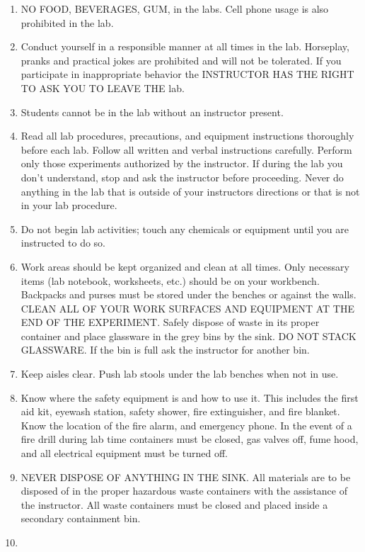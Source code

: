 \documentclass[]{book}
\providecommand{\tightlist}{%
  \setlength{\itemsep}{0pt}\setlength{\parskip}{0pt}}
\begin{document}
\begin{enumerate}
\def\labelenumi{\arabic{enumi}.}
\tightlist
\item
  NO FOOD, BEVERAGES, GUM, in the labs. Cell phone usage is also prohibited in the lab.
\item
  Conduct yourself in a responsible manner at all times in the lab. Horseplay, pranks and practical jokes are prohibited and will not be tolerated. If you participate in inappropriate behavior the INSTRUCTOR HAS THE RIGHT TO ASK YOU TO LEAVE THE lab.
\item
  Students cannot be in the lab without an instructor present.
\item
  Read all lab procedures, precautions, and equipment instructions thoroughly before each lab. Follow all written and verbal instructions carefully. Perform only those experiments authorized by the instructor. If during the lab you don't understand, stop and ask the instructor before proceeding. Never do anything in the lab that is outside of your instructors directions or that is not in your lab procedure.
\item
  Do not begin lab activities; touch any chemicals or equipment until you are instructed to do so.
\item
  Work areas should be kept organized and clean at all times. Only necessary items (lab notebook, worksheets, etc.) should be on your workbench. Backpacks and purses must be stored under the benches or against the walls. CLEAN ALL OF YOUR WORK SURFACES AND EQUIPMENT AT THE END OF THE EXPERIMENT. Safely dispose of waste in its proper container and place glassware in the grey bins by the sink. DO NOT STACK GLASSWARE. If the bin is full ask the instructor for another bin.
\item
  Keep aisles clear. Push lab stools under the lab benches when not in use.
\item
  Know where the safety equipment is and how to use it. This includes the first aid kit, eyewash station, safety shower, fire extinguisher, and fire blanket. Know the location of the fire alarm, and emergency phone. In the event of a fire drill during lab time containers must be closed, gas valves off, fume hood, and all electrical equipment must be turned off.
\item
  NEVER DISPOSE OF ANYTHING IN THE SINK. All materials are to be disposed of in the proper hazardous waste containers with the assistance of the instructor. All waste containers must be closed and placed inside a secondary containment bin.
\item

\end{enumerate}
\end{document}
